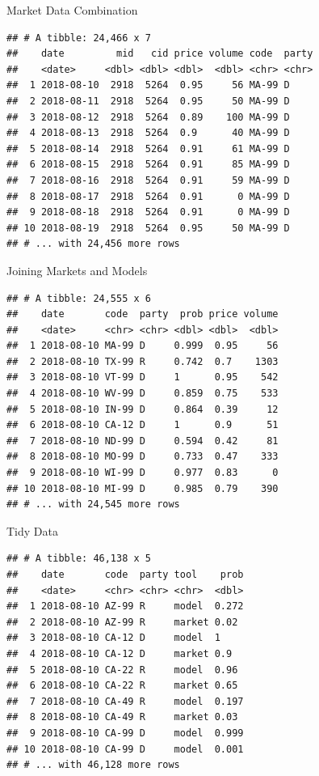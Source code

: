 \documentclass[ignorenonframetext,]{beamer}
\begin{document}
\begin{frame}[fragile]{Market Data Combination}

\begin{verbatim}
## # A tibble: 24,466 x 7
##    date         mid   cid price volume code  party
##    <date>     <dbl> <dbl> <dbl>  <dbl> <chr> <chr>
##  1 2018-08-10  2918  5264  0.95     56 MA-99 D    
##  2 2018-08-11  2918  5264  0.95     50 MA-99 D    
##  3 2018-08-12  2918  5264  0.89    100 MA-99 D    
##  4 2018-08-13  2918  5264  0.9      40 MA-99 D    
##  5 2018-08-14  2918  5264  0.91     61 MA-99 D    
##  6 2018-08-15  2918  5264  0.91     85 MA-99 D    
##  7 2018-08-16  2918  5264  0.91     59 MA-99 D    
##  8 2018-08-17  2918  5264  0.91      0 MA-99 D    
##  9 2018-08-18  2918  5264  0.91      0 MA-99 D    
## 10 2018-08-19  2918  5264  0.95     50 MA-99 D    
## # ... with 24,456 more rows
\end{verbatim}

\end{frame}

\begin{frame}[fragile]{Joining Markets and Models}

\begin{verbatim}
## # A tibble: 24,555 x 6
##    date       code  party  prob price volume
##    <date>     <chr> <chr> <dbl> <dbl>  <dbl>
##  1 2018-08-10 MA-99 D     0.999  0.95     56
##  2 2018-08-10 TX-99 R     0.742  0.7    1303
##  3 2018-08-10 VT-99 D     1      0.95    542
##  4 2018-08-10 WV-99 D     0.859  0.75    533
##  5 2018-08-10 IN-99 D     0.864  0.39     12
##  6 2018-08-10 CA-12 D     1      0.9      51
##  7 2018-08-10 ND-99 D     0.594  0.42     81
##  8 2018-08-10 MO-99 D     0.733  0.47    333
##  9 2018-08-10 WI-99 D     0.977  0.83      0
## 10 2018-08-10 MI-99 D     0.985  0.79    390
## # ... with 24,545 more rows
\end{verbatim}

\end{frame}

\begin{frame}[fragile]{Tidy Data}

\begin{verbatim}
## # A tibble: 46,138 x 5
##    date       code  party tool    prob
##    <date>     <chr> <chr> <chr>  <dbl>
##  1 2018-08-10 AZ-99 R     model  0.272
##  2 2018-08-10 AZ-99 R     market 0.02 
##  3 2018-08-10 CA-12 D     model  1    
##  4 2018-08-10 CA-12 D     market 0.9  
##  5 2018-08-10 CA-22 R     model  0.96 
##  6 2018-08-10 CA-22 R     market 0.65 
##  7 2018-08-10 CA-49 R     model  0.197
##  8 2018-08-10 CA-49 R     market 0.03 
##  9 2018-08-10 CA-99 D     model  0.999
## 10 2018-08-10 CA-99 D     model  0.001
## # ... with 46,128 more rows
\end{verbatim}

\end{frame}
\end{document}
